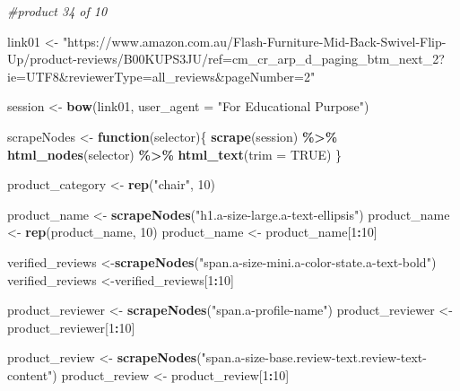 \documentclass[
]{article}
\newenvironment{Shaded}{\begin{snugshade}}{\end{snugshade}}
\newcommand{\AttributeTok}[1]{\textcolor[rgb]{0.13,0.29,0.53}{#1}}
\newcommand{\CommentTok}[1]{\textcolor[rgb]{0.56,0.35,0.01}{\textit{#1}}}
\newcommand{\ConstantTok}[1]{\textcolor[rgb]{0.56,0.35,0.01}{#1}}
\newcommand{\ControlFlowTok}[1]{\textcolor[rgb]{0.13,0.29,0.53}{\textbf{#1}}}
\newcommand{\DecValTok}[1]{\textcolor[rgb]{0.00,0.00,0.81}{#1}}
\newcommand{\FunctionTok}[1]{\textcolor[rgb]{0.13,0.29,0.53}{\textbf{#1}}}
\newcommand{\NormalTok}[1]{#1}
\newcommand{\OtherTok}[1]{\textcolor[rgb]{0.56,0.35,0.01}{#1}}
\newcommand{\SpecialCharTok}[1]{\textcolor[rgb]{0.81,0.36,0.00}{\textbf{#1}}}
\newcommand{\StringTok}[1]{\textcolor[rgb]{0.31,0.60,0.02}{#1}}
\begin{document}
\begin{Shaded}
\begin{Highlighting}[]
\CommentTok{\#product 34 of 10}

\NormalTok{link01 }\OtherTok{\textless{}{-}} \StringTok{"https://www.amazon.com.au/Flash{-}Furniture{-}Mid{-}Back{-}Swivel{-}Flip{-}Up/product{-}reviews/B00KUPS3JU/ref=cm\_cr\_arp\_d\_paging\_btm\_next\_2?ie=UTF8\&reviewerType=all\_reviews\&pageNumber=2"}


\NormalTok{  session }\OtherTok{\textless{}{-}} \FunctionTok{bow}\NormalTok{(link01,}
               \AttributeTok{user\_agent =} \StringTok{"For Educational Purpose"}\NormalTok{)}

\NormalTok{  scrapeNodes }\OtherTok{\textless{}{-}} \ControlFlowTok{function}\NormalTok{(selector)\{}
    \FunctionTok{scrape}\NormalTok{(session) }\SpecialCharTok{\%\textgreater{}\%}
      \FunctionTok{html\_nodes}\NormalTok{(selector) }\SpecialCharTok{\%\textgreater{}\%}
      \FunctionTok{html\_text}\NormalTok{(}\AttributeTok{trim =} \ConstantTok{TRUE}\NormalTok{)}
\NormalTok{  \}}

\NormalTok{  product\_category }\OtherTok{\textless{}{-}} \FunctionTok{rep}\NormalTok{(}\StringTok{"chair"}\NormalTok{, }\DecValTok{10}\NormalTok{)}

\NormalTok{  product\_name }\OtherTok{\textless{}{-}} \FunctionTok{scrapeNodes}\NormalTok{(}\StringTok{"h1.a{-}size{-}large.a{-}text{-}ellipsis"}\NormalTok{)}
\NormalTok{  product\_name }\OtherTok{\textless{}{-}} \FunctionTok{rep}\NormalTok{(product\_name, }\DecValTok{10}\NormalTok{)}
\NormalTok{  product\_name }\OtherTok{\textless{}{-}}\NormalTok{ product\_name[}\DecValTok{1}\SpecialCharTok{:}\DecValTok{10}\NormalTok{]}
  
\NormalTok{  verified\_reviews }\OtherTok{\textless{}{-}}\FunctionTok{scrapeNodes}\NormalTok{(}\StringTok{"span.a{-}size{-}mini.a{-}color{-}state.a{-}text{-}bold"}\NormalTok{)}
\NormalTok{  verified\_reviews }\OtherTok{\textless{}{-}}\NormalTok{verified\_reviews[}\DecValTok{1}\SpecialCharTok{:}\DecValTok{10}\NormalTok{]}
  
\NormalTok{  product\_reviewer }\OtherTok{\textless{}{-}} \FunctionTok{scrapeNodes}\NormalTok{(}\StringTok{"span.a{-}profile{-}name"}\NormalTok{)}
\NormalTok{  product\_reviewer }\OtherTok{\textless{}{-}}\NormalTok{ product\_reviewer[}\DecValTok{1}\SpecialCharTok{:}\DecValTok{10}\NormalTok{]}
  
\NormalTok{  product\_review }\OtherTok{\textless{}{-}} \FunctionTok{scrapeNodes}\NormalTok{(}\StringTok{"span.a{-}size{-}base.review{-}text.review{-}text{-}content"}\NormalTok{)}
\NormalTok{  product\_review }\OtherTok{\textless{}{-}}\NormalTok{ product\_review[}\DecValTok{1}\SpecialCharTok{:}\DecValTok{10}\NormalTok{]}
  

\end{Highlighting}
\end{Shaded}
\end{document}

